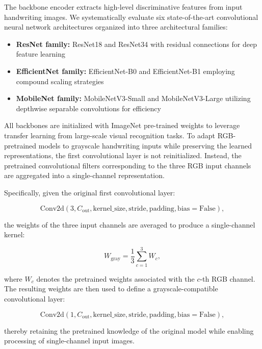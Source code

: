 The backbone encoder extracts high-level discriminative features from input handwriting images. We systematically evaluate six state-of-the-art convolutional neural network architectures organized into three architectural families:

\begin{itemize}
\item \textbf{ResNet family:} ResNet18 and ResNet34 with residual connections for deep feature learning
\item \textbf{EfficientNet family:} EfficientNet-B0 and EfficientNet-B1 employing compound scaling strategies
\item \textbf{MobileNet family:} MobileNetV3-Small and MobileNetV3-Large utilizing depthwise separable convolutions for efficiency
\end{itemize}

All backbones are initialized with ImageNet pre-trained weights to leverage transfer learning from large-scale visual recognition tasks. To adapt RGB-pretrained models to grayscale handwriting inputs while preserving the learned representations, the first convolutional layer is not reinitialized. Instead, the pretrained convolutional filters corresponding to the three RGB input channels are aggregated into a single-channel representation.

Specifically, given the original first convolutional layer:

\begin{equation}
\text{Conv2d}(3, C_{\text{out}}, \text{kernel\_size}, \text{stride}, \text{padding}, \text{bias}=\text{False}),
\end{equation}

the weights of the three input channels are averaged to produce a single-channel kernel:

\begin{equation}
W_{\text{gray}} = \frac{1}{3} \sum_{c=1}^{3} W_c,
\end{equation}

where $W_c$ denotes the pretrained weights associated with the $c$-th RGB channel.  
The resulting weights are then used to define a grayscale-compatible convolutional layer:

\begin{equation}
\text{Conv2d}(1, C_{\text{out}}, \text{kernel\_size}, \text{stride}, \text{padding}, \text{bias}=\text{False}),
\end{equation}

thereby retaining the pretrained knowledge of the original model while enabling processing of single-channel input images.


